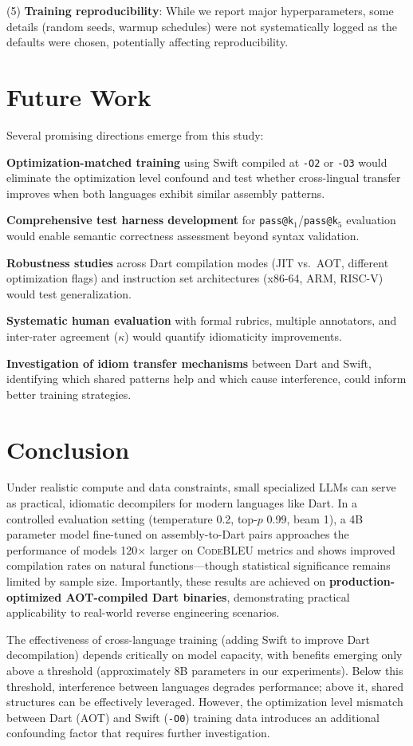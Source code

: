 \documentclass[10pt,conference]{IEEEtran}
\makeatletter
\newcommand{\codebleu}{\textsc{CodeBLEU}\xspace}
\newcommand{\passatk}{\texttt{pass@k}\xspace}
\makeatother
\begin{document}
(5) \textbf{Training reproducibility}: While we report major hyperparameters, some details (random seeds, warmup schedules) were not systematically logged as the defaults were chosen, potentially affecting reproducibility.

\section{Future Work}
Several promising directions emerge from this study:

\textbf{Optimization-matched training} using Swift compiled at \texttt{-O2} or \texttt{-O3} would eliminate the optimization level confound and test whether cross-lingual transfer improves when both languages exhibit similar assembly patterns.

\textbf{Comprehensive test harness development} for \passatk$_1$/\passatk$_5$ evaluation would enable semantic correctness assessment beyond syntax validation.

\textbf{Robustness studies} across Dart compilation modes (JIT vs.\ AOT, different optimization flags) and instruction set architectures (x86-64, ARM, RISC-V) would test generalization.

\textbf{Systematic human evaluation} with formal rubrics, multiple annotators, and inter-rater agreement ($\kappa$) would quantify idiomaticity improvements.

\textbf{Investigation of idiom transfer mechanisms} between Dart and Swift, identifying which shared patterns help and which cause interference, could inform better training strategies.

\section{Conclusion}
Under realistic compute and data constraints, small specialized LLMs can serve as practical, idiomatic decompilers for modern languages like Dart. In a controlled evaluation setting (temperature 0.2, top-$p$ 0.99, beam 1), a 4B parameter model fine-tuned on assembly-to-Dart pairs approaches the performance of models 120× larger on \codebleu{} metrics and shows improved compilation rates on natural functions—though statistical significance remains limited by sample size. Importantly, these results are achieved on \textbf{production-optimized AOT-compiled Dart binaries}, demonstrating practical applicability to real-world reverse engineering scenarios.

The effectiveness of cross-language training (adding Swift to improve Dart decompilation) depends critically on model capacity, with benefits emerging only above a threshold (approximately 8B parameters in our experiments). Below this threshold, interference between languages degrades performance; above it, shared structures can be effectively leveraged. However, the optimization level mismatch between Dart (AOT) and Swift (\texttt{-O0}) training data introduces an additional confounding factor that requires further investigation.
\end{document}

